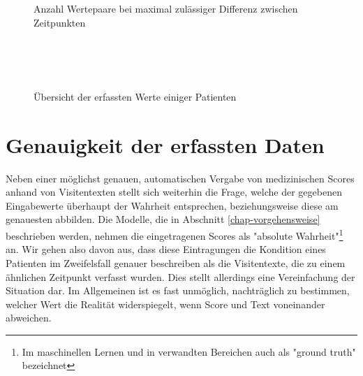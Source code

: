 \begin{figure}[htp]
    \captionsetup{justification=centering}
    \centering
    \quad
    \caption{Anzahl Wertepaare bei maximal zulässiger Differenz zwischen \mbox{Zeitpunkten}}
    \label{fig:n_pairs_by_max_offset}
\end{figure}

\begin{figure}[p]
    \centering
     \\
     \\
     \\
    \caption{Übersicht der erfassten Werte einiger Patienten}
    \label{fig:pat_example_scatterplots}
\end{figure}

\section{Genauigkeit der erfassten Daten}\label{section:genauigkeit_der_daten}
Neben einer möglichst genauen, automatischen Vergabe von medizinischen Scores anhand von Visitentexten stellt sich weiterhin die Frage, welche der gegebenen Eingabewerte überhaupt der Wahrheit entsprechen, beziehungsweise diese am genauesten abbilden. Die Modelle, die in Abschnitt \ref{chap-vorgehensweise} beschrieben werden, nehmen die eingetragenen Scores als "absolute Wahrheit"\footnote{Im maschinellen Lernen und in verwandten Bereichen auch als "ground truth" bezeichnet} an. Wir gehen also davon aus, dass diese Eintragungen die Kondition eines Patienten im Zweifelsfall genauer beschreiben als die Visitentexte, die zu einem ähnlichen Zeitpunkt verfasst wurden. Dies stellt allerdings eine Vereinfachung der Situation dar. Im Allgemeinen ist es fast unmöglich, nachträglich zu bestimmen, welcher Wert die Realität widerspiegelt, wenn Score und Text voneinander abweichen. 

